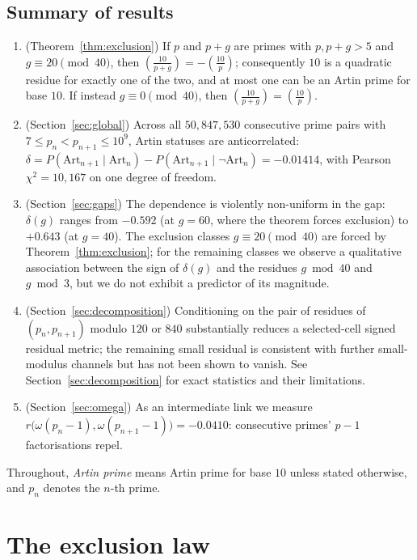 \documentclass[11pt]{amsart}
\theoremstyle{definition}
\newcommand{\Lsym}[2]{\left(\tfrac{#1}{#2}\right)}
\newcommand{\Art}{\mathrm{Art}}
\begin{document}
\subsection*{Summary of results}
\begin{enumerate}
	\item (Theorem~\ref{thm:exclusion}) If $p$ and $p + g$ are primes with
	      $p, p + g > 5$ and $g \equiv 20 \pmod{40}$, then $\Lsym{10}{p+g} = -\Lsym{10}{p}$;
	      consequently $10$ is a quadratic residue for exactly one of the two, and at
	      most one can be an Artin prime for base $10$. If instead
	      $g \equiv 0 \pmod{40}$, then $\Lsym{10}{p+g} = \Lsym{10}{p}$.
	\item (Section~\ref{sec:global}) Across all $50{,}847{,}530$ consecutive
	      prime pairs with $7 \le p_n < p_{n+1} \le 10^9$, Artin statuses are
	      anticorrelated:
	      $\delta = P(\Art_{n+1} \mid \Art_n) - P(\Art_{n+1} \mid \lnot \Art_n)
		      = -0.01414$, with Pearson $\chi^2 = 10{,}167$ on one degree of freedom.
	\item (Section~\ref{sec:gaps}) The dependence is violently non-uniform in
	      the gap: $\delta(g)$ ranges from $-0.592$ (at $g = 60$, where the theorem
	      forces exclusion) to $+0.643$ (at $g = 40$). The exclusion classes
	      $g \equiv 20 \pmod{40}$ are forced by Theorem~\ref{thm:exclusion}; for
	      the remaining classes we observe a qualitative association between the
	      sign of $\delta(g)$ and the residues $g \bmod 40$ and $g \bmod 3$, but
	      we do not exhibit a predictor of its magnitude.
	\item (Section~\ref{sec:decomposition}) Conditioning on the pair of residues
	      of $(p_n, p_{n+1})$ modulo $120$ or $840$ substantially reduces a
	      selected-cell signed residual metric; the remaining small residual
	      is consistent with further small-modulus channels but has not been shown to
	      vanish. See Section~\ref{sec:decomposition} for exact statistics and
	      their limitations.
	\item (Section~\ref{sec:omega}) As an intermediate link
	      we measure $r\bigl(\omega(p_n-1), \omega(p_{n+1}-1)\bigr) = -0.0410$:
	      consecutive primes' $p-1$ factorisations repel.
\end{enumerate}

Throughout, \emph{Artin prime} means Artin prime for base $10$ unless stated
otherwise, and $p_n$ denotes the $n$-th prime.

\section{The exclusion law}
\label{sec:theorem}
\end{document}
